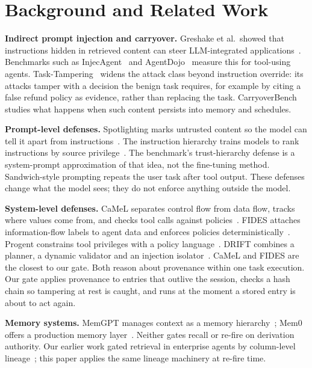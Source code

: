 \documentclass[conference]{IEEEtran}
\begin{document}
\section{Background and Related Work}
\label{sec:related}

\textbf{Indirect prompt injection and carryover.} Greshake et al.\ showed that instructions
hidden in retrieved content can steer LLM-integrated applications~\cite{greshake2023indirect}.
Benchmarks such as InjecAgent~\cite{zhan2024injecagent} and AgentDojo~\cite{debenedetti2024agentdojo}
measure this for tool-using agents. Task-Tampering~\cite{zhang2026tasktampering} widens the
attack class beyond instruction override: its attacks tamper with a decision the benign task
requires, for example by citing a false refund policy as evidence, rather than replacing the
task. CarryoverBench~\cite{xu2026carryover}
studies what happens when such content persists into memory and schedules.

\textbf{Prompt-level defenses.} Spotlighting marks untrusted content so the model can tell it
apart from instructions~\cite{hines2024spotlighting}. The instruction hierarchy trains models to
rank instructions by source privilege~\cite{wallace2024instruction}. The benchmark's
trust-hierarchy defense is a system-prompt approximation of that idea, not the fine-tuning method. Sandwich-style prompting
repeats the user task after tool output. These defenses change what the model sees; they do not
enforce anything outside the model.

\textbf{System-level defenses.} CaMeL separates control flow from data flow, tracks where values
come from, and checks tool calls against policies~\cite{debenedetti2025camel}. FIDES attaches
information-flow labels to agent data and enforces policies deterministically~\cite{costa2025fides}.
Progent constrains tool privileges with a policy language~\cite{shi2025progent}. DRIFT combines a
planner, a dynamic validator and an injection isolator~\cite{li2025drift}. CaMeL and FIDES are the
closest to our gate. Both reason about provenance within one task execution. Our gate applies
provenance to entries that outlive the session, checks a hash chain so tampering at rest is
caught, and runs at the moment a stored entry is about to act again.

\textbf{Memory systems.} MemGPT manages context as a memory hierarchy~\cite{packer2023memgpt};
Mem0 offers a production memory layer~\cite{chhikara2025mem0}. Neither gates recall or re-fire on derivation authority. Our earlier work gated retrieval in enterprise agents by
column-level lineage~\cite{sangaraju2026lineage}; this paper applies the same lineage machinery
at re-fire time.
\end{document}

